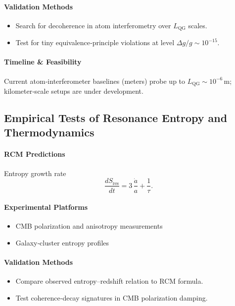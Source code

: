 \paragraph{Validation Methods}
\begin{itemize}
  \item Search for decoherence in atom interferometry over $L_{\mathrm{QG}}$ scales.  
  \item Test for tiny equivalence‐principle violations at level $\Delta g/g\sim10^{-15}$.
\end{itemize}

\paragraph{Timeline \& Feasibility}
Current atom‐interferometer baselines (meters) probe up to $L_{\mathrm{QG}}\sim10^{-6}\,$m; kilometer‐scale setups are under development.

\subsection{Empirical Tests of Resonance Entropy and Thermodynamics}

\paragraph{RCM Predictions}
Entropy growth rate
\[
\frac{dS_{\mathrm{res}}}{dt}
= 3\,\frac{\dot a}{a} + \frac{1}{\tau}.
\]

\paragraph{Experimental Platforms}
\begin{itemize}
  \item CMB polarization and anisotropy measurements  
  \item Galaxy‐cluster entropy profiles  
\end{itemize}

\paragraph{Validation Methods}
\begin{itemize}
  \item Compare observed entropy–redshift relation to RCM formula.  
  \item Test coherence‐decay signatures in CMB polarization damping.
\end{itemize}


